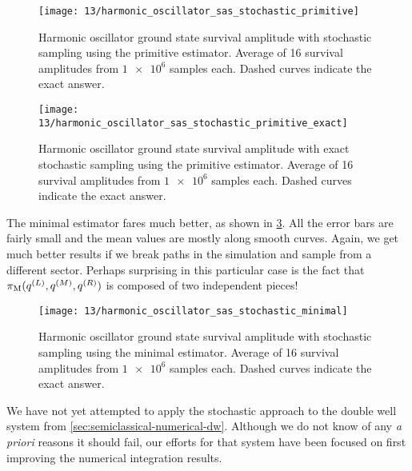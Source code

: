 \begin{figure}
	\centering
	\texttt{[image: 13/harmonic\_oscillator\_sas\_stochastic\_primitive]}
	\caption[
		Harmonic oscillator survival amplitude using primitive estimator
	]{
		Harmonic oscillator ground state survival amplitude with stochastic sampling using the primitive estimator.
		Average of 16 survival amplitudes from $\num{1e6}$ samples each.
		Dashed curves indicate the exact answer.
	}
	\label{fig:harmonic-oscillator-survival-primitive}
\end{figure}

\begin{figure}
	\centering
	\texttt{[image: 13/harmonic\_oscillator\_sas\_stochastic\_primitive\_exact]}
	\caption[
		Harmonic oscillator survival amplitude using primitive estimator (exact sampling)
	]{
		Harmonic oscillator ground state survival amplitude with exact stochastic sampling using the primitive estimator.
		Average of 16 survival amplitudes from $\num{1e6}$ samples each.
		Dashed curves indicate the exact answer.
	}
	\label{fig:harmonic-oscillator-survival-primitive-exact}
\end{figure}

The minimal estimator fares much better, as shown in \cref{fig:harmonic-oscillator-survival-minimal}.
All the error bars are fairly small and the mean values are mostly along smooth curves.
Again, we get much better results if we break paths in the simulation and sample from a different sector.
Perhaps surprising in this particular case is the fact that $\pi_\mathrm{M}(q^{(L)}, q^{(M)}, q^{(R)})$ is composed of two independent pieces!

\begin{figure}
	\centering
	\texttt{[image: 13/harmonic\_oscillator\_sas\_stochastic\_minimal]}
	\caption[
		Harmonic oscillator survival amplitude using minimal estimator
	]{
		Harmonic oscillator ground state survival amplitude with stochastic sampling using the minimal estimator.
		Average of 16 survival amplitudes from $\num{1e6}$ samples each.
		Dashed curves indicate the exact answer.
	}
	\label{fig:harmonic-oscillator-survival-minimal}
\end{figure}

We have not yet attempted to apply the stochastic approach to the double well system from \cref{sec:semiclassical-numerical-dw}.
Although we do not know of any \textit{a priori} reasons it should fail, our efforts for that system have been focused on first improving the numerical integration results.
